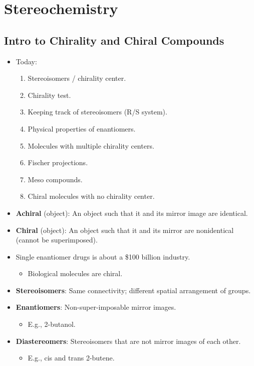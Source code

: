 \documentclass[../notes.tex]{subfiles}
\begin{document}
\chapter{Stereochemistry}
\section{Intro to Chirality and Chiral Compounds}
\begin{itemize}
    \item {}Today:
    \begin{enumerate}
        \item Stereoisomers / chirality center.
        \item Chirality test.
        \item Keeping track of stereoisomers (R/S system).
        \item Physical properties of enantiomers.
        \item Molecules with multiple chirality centers.
        \item Fischer projections.
        \item Meso compounds.
        \item Chiral molecules with no chirality center.
    \end{enumerate}
    \item \textbf{Achiral} (object): An object such that it and its mirror image are identical.
    \item \textbf{Chiral} (object): An object such that it and its mirror are nonidentical (cannot be superimposed).
    \item Single enantiomer drugs is about a \$100 billion industry.
    \begin{itemize}
        \item Biological molecules are chiral.
    \end{itemize}
    \item \textbf{Stereoisomers}: Same connectivity; different spatial arrangement of groups.
    \item \textbf{Enantiomers}: Non-super-imposable mirror images.
    \begin{itemize}
        \item E.g., 2-butanol.
    \end{itemize}
    \item \textbf{Diastereomers}: Stereoisomers that are not mirror images of each other.
    \begin{itemize}
        \item E.g., cis and trans 2-butene.

\end{itemize}
\end{itemize}
\end{document}
